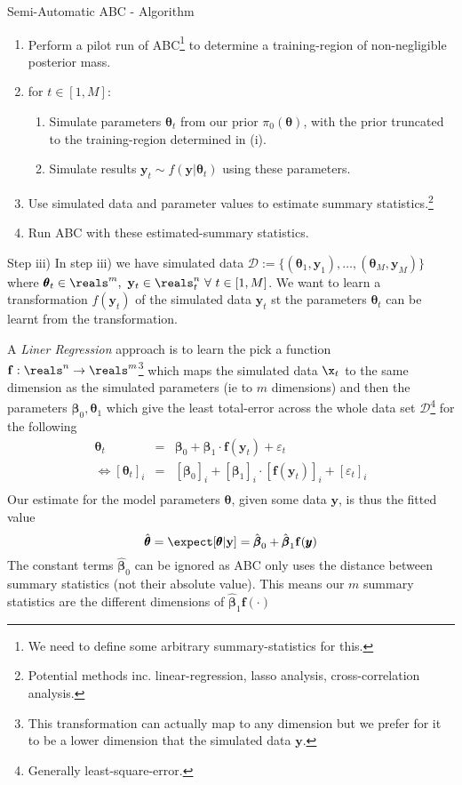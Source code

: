 \documentclass[11pt,a4paper]{article}
\begin{document}
  \begin{proposition}{Semi-Automatic ABC - Algorithm}
    \begin{enumerate}
      \item Perform a pilot run of ABC\footnote{We need to define some arbitrary summary-statistics for this.} to determine a training-region of non-negligible posterior mass.
      \item for $t\in[1,M]$:
      \begin{enumerate}
        \item Simulate parameters $\pmb\theta_t$ from our prior $\pi_0(\pmb\theta)$, with the prior truncated to the training-region determined in (i).
        \item Simulate results $\mathbf{y}_t\sim f(\mathbf{y}|\pmb\theta_t)$ using these parameters.
      \end{enumerate}
      \item Use simulated data and parameter values to estimate summary statistics.\footnote{Potential methods inc. linear-regression, lasso analysis, cross-correlation analysis.}
      \item Run ABC with these estimated-summary statistics.
    \end{enumerate}
  \end{proposition}

  \begin{remark}{Step iii)}
    In step iii) we have simulated data $\mathcal{D}:=\{(\pmb\theta_1,\mathbf{y}_1),\dots,(\pmb\theta_M,\mathbf{y}_M)\}$ where $\pmb\theta_t\in\reals^m,\ \mathbf{y}_t\in\reals_t^n\ \forall\ t\in[1,M]$. We want to learn a transformation $f(\mathbf{y}_t)$ of the simulated data $\mathbf{y}_t$ st the parameters $\pmb\theta_t$ can be learnt from the transformation.
    \par A \textit{Liner Regression} approach is to learn the pick a function $\mathbf{f}:\reals^n\to\reals^m$\footnote{This transformation can actually map to any dimension but we prefer for it to be a lower dimension that the simulated data $\mathbf{y}$.} which maps the simulated data $\x_t$ to the same dimension as the simulated parameters (ie to $m$ dimensions) and then the parameters $\pmb\beta_0,\pmb\theta_1$ which give the least total-error across the whole data set $\mathcal{D}$\footnote{Generally least-square-error.} for the following
    \[\begin{array}{rcl}
      \pmb\theta_t&=&\pmb\beta_0+\pmb\beta_1\cdot \mathbf{f}(\mathbf{y}_t)+\varepsilon_t\\
      \Leftrightarrow[\pmb\theta_t]_i&=&[\pmb\beta_0]_i+[\pmb\beta_1]_i\cdot[\mathbf{f}(\mathbf{y}_t)]_i+[\varepsilon_t]_i\\
    \end{array}\]
    Our estimate for the model parameters $\pmb\theta$, given some data $\mathbf{y}$, is thus the fitted value
    \[ \hat{\pmb\theta}=\expect[\pmb\theta|\mathbf{y}]=\hat{\pmb\beta}_0+\hat{\pmb\beta}_1 \mathbf{f}(\pmb{y}) \]
    The constant terms $\hat{\pmb\beta}_0$ can be ignored as ABC only uses the distance between summary statistics (not their absolute value). This means our $m$ summary statistics are the different dimensions of $\hat{\pmb\beta}_1\mathbf{f}(\cdot)$
  \end{remark}
\end{document}
